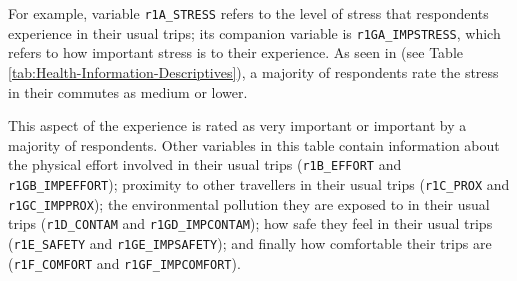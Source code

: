 \documentclass[
11pt, %
oneside, %
english, %
singlespacing, %
]{macthesis} %
\begin{document}
For example, variable \texttt{r1A\_STRESS} refers to the level of stress that respondents experience in their usual trips; its companion variable is \texttt{r1GA\_IMPSTRESS}, which refers to how important stress is to their experience. As seen in (see Table \ref{tab:Health-Information-Descriptives}), a majority of respondents rate the stress in their commutes as medium or lower.

This aspect of the experience is rated as very important or important by a majority of respondents. Other variables in this table contain information about the physical effort involved in their usual trips (\texttt{r1B\_EFFORT} and \texttt{r1GB\_IMPEFFORT}); proximity to other travellers in their usual trips (\texttt{r1C\_PROX} and \texttt{r1GC\_IMPPROX}); the environmental pollution they are exposed to in their usual trips (\texttt{r1D\_CONTAM} and \texttt{r1GD\_IMPCONTAM}); how safe they feel in their usual trips (\texttt{r1E\_SAFETY} and \texttt{r1GE\_IMPSAFETY}); and finally how comfortable their trips are (\texttt{r1F\_COMFORT} and \texttt{r1GF\_IMPCOMFORT}).
\end{document}

